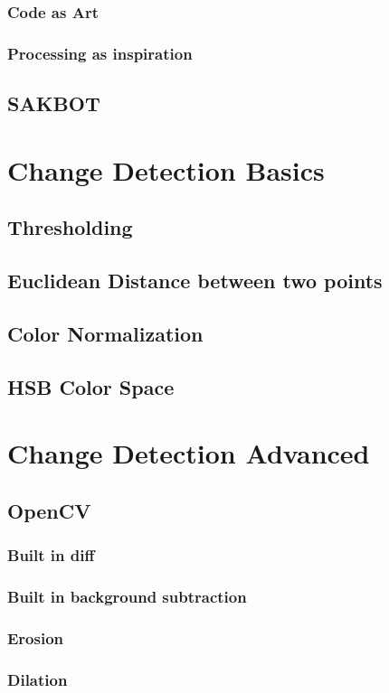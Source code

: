 \documentclass[a4paper]{report}
\begin{document}
\subsubsection{Code as Art}
\subsubsection{Processing as inspiration}
\subsection{SAKBOT}

\section{Change Detection Basics}
\subsection{Thresholding}
\subsection{Euclidean Distance between two points}
\subsection{Color Normalization}
\subsection{HSB Color Space}

\section{Change Detection Advanced}
\subsection{OpenCV}
\subsubsection{Built in diff}
\subsubsection{Built in background subtraction}
\subsubsection{Erosion}
\subsubsection{Dilation}
\end{document}
